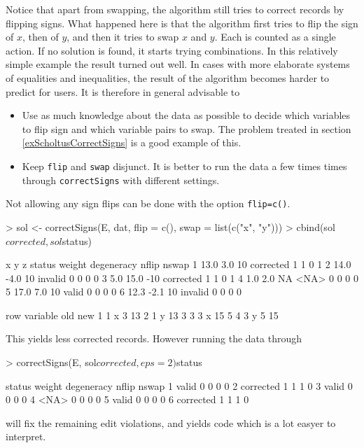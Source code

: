 \documentclass[11pt, fleqn, a4paper]{article}
\begin{document}
Notice that apart from swapping, the algorithm still tries to correct records
by flipping signs.  What happened here is that the algorithm first tries to
flip the sign of $x$, then of $y$, and then it tries to swap $x$ and $y$.  Each
is counted as a single action. If no solution is found, it starts trying
combinations. In this relatively simple example the result turned out well. In
cases with more elaborate systems of equalities and inequalities, the result of
the algorithm becomes harder to predict for users. It is therefore in general
advisable to 
\begin{itemize}
\item Use as much knowledge about the data as possible to decide which
variables to flip sign and which variable pairs to swap.  The problem treated
in section \ref{exScholtusCorrectSigns} is a good example of this.
\item Keep {\tt flip} and {\tt swap} disjunct. It is better to run the data a few times 
        times through {\tt correctSigns} with different settings.
\end{itemize}
Not allowing any sign flips can be done with the option {\tt flip=c()}.
\begin{Schunk}
\begin{Sinput}
> sol <- correctSigns(E, dat, flip = c(), swap = list(c("x", "y")))
> cbind(sol$corrected, sol$status)
\end{Sinput}
\begin{Soutput}
     x    y   z    status weight degeneracy nflip nswap
1 13.0  3.0  10 corrected      1          1     0     1
2 14.0 -4.0  10   invalid      0          0     0     0
3  5.0 15.0 -10 corrected      1          1     0     1
4  1.0  2.0  NA      <NA>      0          0     0     0
5 17.0  7.0  10     valid      0          0     0     0
6 12.3 -2.1  10   invalid      0          0     0     0
\end{Soutput}
\begin{Soutput}
  row variable old new
1   1        x   3  13
2   1        y  13   3
3   3        x  15   5
4   3        y   5  15
\end{Soutput}
\end{Schunk}
This yields less corrected records. However running the data through 
\begin{Schunk}
\begin{Sinput}
> correctSigns(E, sol$corrected, eps = 2)$status
\end{Sinput}
\begin{Soutput}
     status weight degeneracy nflip nswap
1     valid      0          0     0     0
2 corrected      1          1     1     0
3     valid      0          0     0     0
4      <NA>      0          0     0     0
5     valid      0          0     0     0
6 corrected      1          1     1     0
\end{Soutput}
\end{Schunk}
will fix the remaining edit violations, and yields code which is a lot easyer
to interpret.
\end{document}
